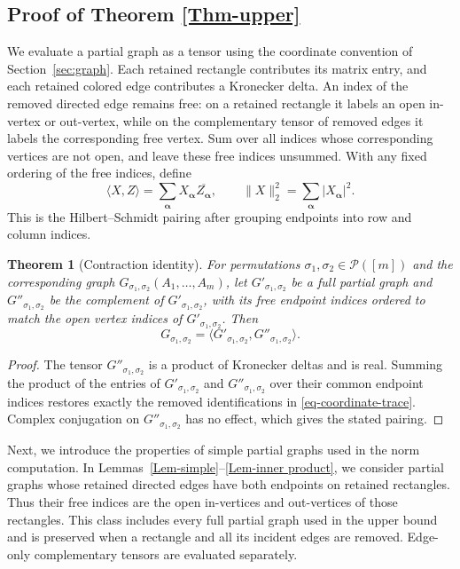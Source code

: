 \documentclass[10pt,a4paper]{amsart}
\numberwithin{equation}{section}
\theoremstyle{plain}
\newtheorem*{theorem*}{Theorem}
\def\cP{\mathcal P}
\begin{document}
\subsection{Proof of Theorem \ref{Thm-upper}}

We evaluate a partial graph as a tensor using the coordinate convention of Section~\ref{sec:graph}. Each retained rectangle contributes its matrix entry, and each retained colored edge contributes a Kronecker delta. An index of the removed directed edge remains free: on a retained rectangle it labels an open in-vertex or out-vertex, while on the complementary tensor of removed edges it labels the corresponding free vertex. Sum over all indices whose corresponding vertices are not open, and leave these free indices unsummed. With any fixed ordering of the free indices, define
\[
\langle X,Z\rangle=\sum_{\boldsymbol\alpha}X_{\boldsymbol\alpha}\overline{Z_{\boldsymbol\alpha}},
\qquad \|X\|_2^2=\sum_{\boldsymbol\alpha}|X_{\boldsymbol\alpha}|^2.
\]
This is the Hilbert--Schmidt pairing after grouping endpoints into row and column indices.

\begin{theorem*}[Contraction identity]
For permutations $\sigma_1,\sigma_2\in\cP([m])$ and the corresponding graph $G_{\sigma_1,\sigma_2}(A_1,\ldots,A_m)$, let $G'_{\sigma_1,\sigma_2}$ be a full partial graph and $G''_{\sigma_1,\sigma_2}$ be the complement of $G'_{\sigma_1,\sigma_2}$, with its free endpoint indices ordered to match the open vertex indices of $G'_{\sigma_1,\sigma_2}$. Then
\[
G_{\sigma_1,\sigma_2} =\langle G'_{\sigma_1,\sigma_2}, G''_{\sigma_1,\sigma_2} \rangle.
\]
\end{theorem*}
\begin{proof}
The tensor $G''_{\sigma_1,\sigma_2}$ is a product of Kronecker deltas and is real. Summing the product of the entries of $G'_{\sigma_1,\sigma_2}$ and $G''_{\sigma_1,\sigma_2}$ over their common endpoint indices restores exactly the removed identifications in \eqref{eq-coordinate-trace}. Complex conjugation on $G''_{\sigma_1,\sigma_2}$ has no effect, which gives the stated pairing.
\end{proof}

Next, we introduce the properties of simple partial graphs used in the norm computation. In Lemmas~\ref{Lem-simple}--\ref{Lem-inner product}, we consider partial graphs whose retained directed edges have both endpoints on retained rectangles. Thus their free indices are the open in-vertices and out-vertices of those rectangles. This class includes every full partial graph used in the upper bound and is preserved when a rectangle and all its incident edges are removed. Edge-only complementary tensors are evaluated separately.
\end{document}
